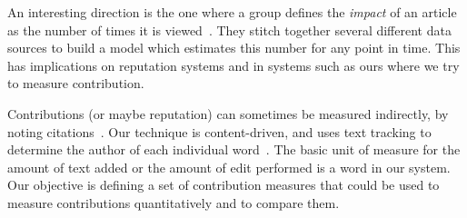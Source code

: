 An interesting direction is the one where a group defines the 
\textit{impact} of an article as the number of times it is 
viewed~\cite{WikiImpact2007}. 
They stitch together several different data sources to build a model 
which estimates this number for any point in time.
This has implications on reputation systems and in systems such as
ours where we try to measure contribution.

Contributions (or maybe reputation) can sometimes be measured 
indirectly, by noting 
citations~\cite{PageRank98,AckCounting2004,WikiMTWtrust06}.
Our technique is content-driven, and uses text tracking
to determine the author of each individual 
word~\cite{RankingControversies2008,www07}.
The basic unit of measure for the amount of text added or the
amount of edit performed is a word in our system.
Our objective is defining a set of contribution measures
that could be used to measure contributions quantitatively
and to compare them.

